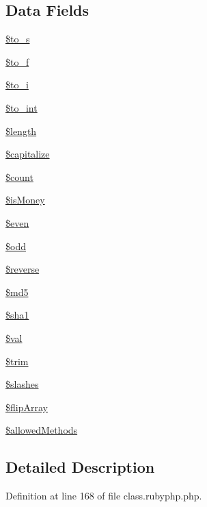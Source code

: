 \subsection*{Data Fields}
\begin{DoxyCompactItemize}
\item 
\hyperlink{classr_a5469620d055732b419fff71704232d2f}{\$to\-\_\-s}
\item 
\hyperlink{classr_a85a2ada0b16d9e59f094e77df5848459}{\$to\-\_\-f}
\item 
\hyperlink{classr_afecc47a810cf510aff6387286b9c0e73}{\$to\-\_\-i}
\item 
\hyperlink{classr_a41eb7bfd09e3b6ad118551accfaad638}{\$to\-\_\-int}
\item 
\hyperlink{classr_adf14d8e29912c1855022dfa252aa4087}{\$length}
\item 
\hyperlink{classr_a41c83fecb936997f3e2dae40207e31dd}{\$capitalize}
\item 
\hyperlink{classr_af789423037bbc89dc7c850e761177570}{\$count}
\item 
\hyperlink{classr_aa2f5c87cc7b1ab41965e940d5c1406d9}{\$is\-Money}
\item 
\hyperlink{classr_ab661cd196618c18d23108b83a10728f3}{\$even}
\item 
\hyperlink{classr_aee2d4fa4e98da4e6ad23bee644ab5e7a}{\$odd}
\item 
\hyperlink{classr_ae0d210fd358fa750a11e63b26f6d26ea}{\$reverse}
\item 
\hyperlink{classr_a2557b214f57a046187b88572e443da1f}{\$md5}
\item 
\hyperlink{classr_a310d84f0b735d2ab692b4e2acd90e7ef}{\$sha1}
\item 
\hyperlink{classr_aac81a74a7b30767af29bfd9a695636df}{\$val}
\item 
\hyperlink{classr_a0ca8b395aaa07c4aac3bdb1f9964d4f5}{\$trim}
\item 
\hyperlink{classr_ac95fd27a35f2d9674ef3760a4ea1d07f}{\$slashes}
\item 
\hyperlink{classr_a530c822a487ad325618509d8bf48553a}{\$flip\-Array}
\item 
\hyperlink{classr_ab278eba7cab5341dacdccecd7a2cc2df}{\$allowed\-Methods}
\end{DoxyCompactItemize}


\subsection{Detailed Description}


Definition at line 168 of file class.\-rubyphp.\-php.



